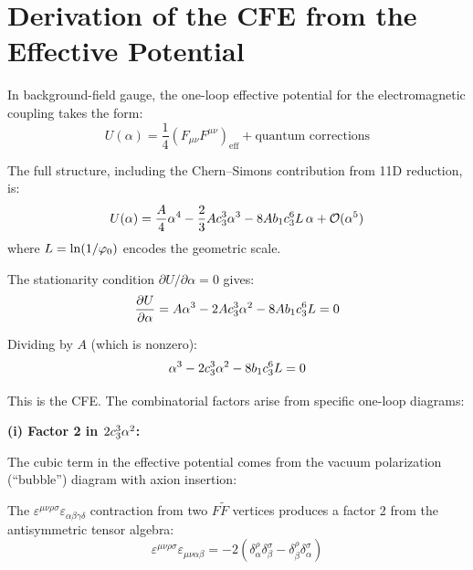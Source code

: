 \section{Derivation of the CFE from the Effective Potential}

In background-field gauge, the one-loop effective potential for the electromagnetic 
coupling takes the form:
\begin{equation}
    U(\alpha) = \frac{1}{4}(F_{\mu\nu}F^{\mu\nu})_{\text{eff}} 
        + \text{quantum corrections}
\end{equation}

The full structure, including the Chern--Simons contribution from 11D reduction, is:
\begin{equation}
    U(\alpha) = \frac{A}{4}\alpha^4 - \frac{2}{3}Ac_3^3\alpha^3 
        - 8Ab_1c_3^6 L\,\alpha + \mathcal{O}(\alpha^5)
    \label{eq:potential}
\end{equation}
where $L = \ln(1/\varphi_0)$ encodes the geometric scale.

The stationarity condition $\partial U/\partial\alpha = 0$ gives:
\begin{equation}
    \frac{\partial U}{\partial\alpha} = A\alpha^3 - 2Ac_3^3\alpha^2 
        - 8Ab_1c_3^6 L = 0
    \label{eq:stationarity}
\end{equation}

Dividing by $A$ (which is nonzero):
\begin{equation}
    \alpha^3 - 2c_3^3\alpha^2 - 8b_1c_3^6 L = 0
    \label{eq:CFE-appendix}
\end{equation}

This is the CFE. The combinatorial factors arise from specific one-loop diagrams:

\textbf{(i) Factor 2 in $2c_3^3\alpha^2$:}

The cubic term in the effective potential comes from the vacuum polarization 
(``bubble'') diagram with axion insertion:
\begin{center}
\end{center}
The $\varepsilon^{\mu\nu\rho\sigma}\varepsilon_{\alpha\beta\gamma\delta}$ contraction from two 
$F\tilde{F}$ vertices produces a factor 2 from the antisymmetric tensor algebra:
\begin{equation}
    \varepsilon^{\mu\nu\rho\sigma}\varepsilon_{\mu\nu\alpha\beta} = -2(\delta^\rho_\alpha\delta^\sigma_\beta - \delta^\rho_\beta\delta^\sigma_\alpha)
\end{equation}

